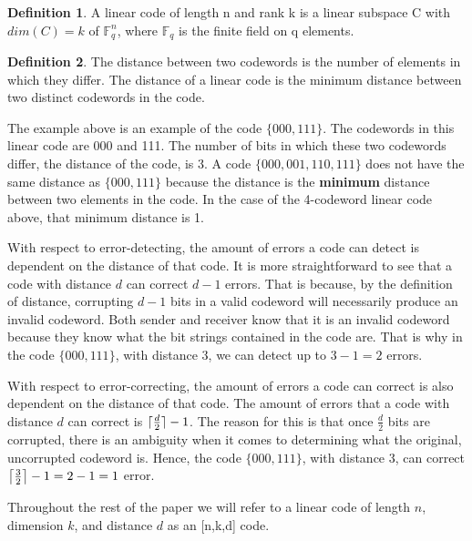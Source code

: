 \documentclass[times,15pt]{article}
\DeclarePairedDelimiter{\ceil}{\lceil}{\rceil}
\theoremstyle{definition}
\newtheorem{definition}{Definition}[section]
\begin{document}
\begin{definition}
A linear code of length n and rank k is a linear subspace C with $dim(C)=k$ of $\mathbb{F}_{q}^{n}$, where $\mathbb{F}_{q}$ is the finite field on q elements. 
\end{definition}	

\begin{definition}
The distance between two codewords is the number of elements in which they differ.  The distance of a linear code is the minimum distance between two distinct codewords in the code.
\end{definition}

\hspace*{8pt} The example above is an example of the code $\{000,111\}$.  The codewords in this linear code are 000 and 111.  The number of bits in which these two codewords differ, the distance of the code, is 3.  A code $\{000,001,110,111\}$ does not have the same distance as $\{000,111\}$ because the distance is the \textbf{minimum} distance between two elements in the code.  In the case of the 4-codeword linear code above, that minimum distance is 1.  

\hspace*{8pt} With respect to error-detecting, the amount of errors a code can detect is dependent on the distance of that code.  It is more straightforward to see that a code with distance $d$ can correct $d-1$ errors.  That is because, by the definition of distance, corrupting $d-1$ bits in a valid codeword will necessarily produce an invalid codeword.  Both sender and receiver know that it is an invalid codeword because they know what the bit strings contained in the code are.  That is why in the code $\{000,111\}$, with distance 3, we can detect up to $3-1 = 2$ errors.  

\hspace*{8pt} With respect to error-correcting, the amount of errors a code can correct is also dependent on the distance of that code.  The amount of errors that a code with distance $d$ can correct is $\ceil[\bigcap]{\frac{d}{2}} - 1$.  The reason for this is that once $\frac{d}{2}$ bits are corrupted, there is an ambiguity when it comes to determining what the original, uncorrupted codeword is.  Hence, the code $\{000,111\}$, with distance 3, can correct $\ceil[\big]{\frac{3}{2}}-1 = 2-1 = 1$ error.

\hspace*{8pt} Throughout the rest of the paper we will refer to a linear code of length $n$, dimension $k$, and distance $d$ as an [n,k,d] code.  
\end{document}

